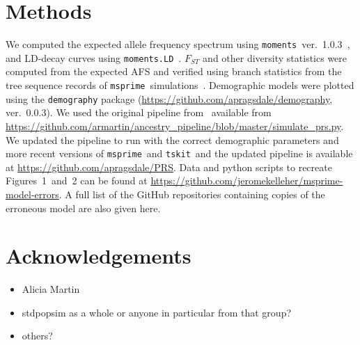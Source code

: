 \documentclass{article}
\newcommand{\msprime}[0]{\texttt{msprime}}
\newcommand{\tskit}[0]{\texttt{tskit}}
\begin{document}
\section{Methods}


We computed the expected allele frequency spectrum using
\texttt{moments}~ver.~1.0.3~\citep{jouganous2017inferring}, and LD-decay curves using
\texttt{moments.LD}~\citep{ragsdale2019models}. $F_{ST}$ and other diversity statistics
were computed from the expected AFS and verified using branch statistics from the
tree sequence records of \msprime\ simulations~\citep{ralph2020efficiently}.
Demographic models were plotted using the \texttt{demography} package
(\url{https://github.com/apragsdale/demography}, ver.~0.0.3).
We used the original pipeline from~\citet{martin2017human} available from
\url{https://github.com/armartin/ancestry_pipeline/blob/master/simulate_prs.py}.
We updated the pipeline to run with the correct demographic parameters and more
recent versions of \msprime\ and \tskit\, and the updated pipeline is
available at \url{https://github.com/apragsdale/PRS}.
Data and python scripts to recreate Figures~1~and~2 can be found at
\url{https://github.com/jeromekelleher/msprime-model-errors}.
A full list of the GitHub repositories containing copies of the erroneous
model are also given here.

\section*{Acknowledgements}

\begin{itemize}
\item Alicia Martin
\item stdpopsim as a whole or anyone in particular from that group?
\item others?
\end{itemize}




\pagebreak
\end{document}
